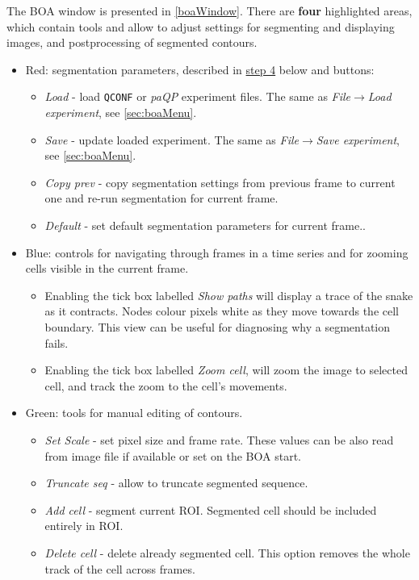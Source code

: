 \documentclass[a4paper,12pt]{article}
\begin{document}
The BOA window is presented in \autoref{boaWindow}. There are \textbf{four} highlighted areas, which contain tools and allow to adjust settings for segmenting and displaying images, and postprocessing of segmented contours. 
\begin{itemize}
	\item Red: segmentation parameters, described in \hyperref[step4]{step 4} below and buttons:
	\begin{itemize}
		\item \textit{Load} - load \texttt{QCONF} or \textit{paQP} experiment files. The same as \textit{File}$\rightarrow$\textit{Load experiment}, see \autoref{sec:boaMenu}.
		\item \textit{Save} - update loaded experiment. The same as \textit{File}$\rightarrow$\textit{Save experiment}, see \autoref{sec:boaMenu}.
		\item \textit{Copy prev} - copy segmentation settings from previous frame to current one and re-run segmentation for current frame.
		\item \textit{Default} - set default segmentation parameters for current frame..
	\end{itemize}
	\item Blue: controls for navigating through frames in a time series and for zooming cells visible in the current frame. 
	\begin{itemize}
		\item Enabling the tick box labelled \textit{Show paths} will display a trace of the snake as it contracts.  Nodes colour pixels white as they move towards the cell boundary.  This view can be useful for diagnosing why a segmentation fails.
		\item 	Enabling the tick box labelled \textit{Zoom cell}, will zoom the image to selected cell, and track the zoom to the cell's movements.
	\end{itemize}
	\item Green: tools for manual editing of contours.
	\begin{itemize}
		\item \textit{Set Scale} - set pixel size and frame rate. These values can be also read from image file if available or set on the BOA start.
		\item \textit{Truncate seq} - allow to truncate segmented sequence.
		\item \textit{Add cell} - segment current ROI. Segmented cell should be included entirely in ROI. 
		\item \textit{Delete cell} - delete already segmented cell. This option removes the whole track of the cell across frames.

\end{itemize}
\end{itemize}
\end{document}
